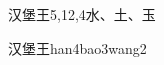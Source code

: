\begin{entry}{汉堡王}{5,12,4}{⽔、⼟、⽟}
  \begin{phonetics}{汉堡王}{han4bao3wang2}
  \end{phonetics}
\end{entry}
